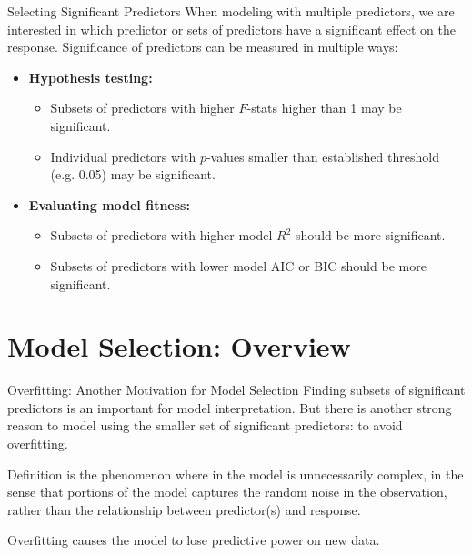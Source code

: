 \documentclass[12pt,t]{beamer}
\let\emph\relax %
\begin{document}
\begin{frame}{Selecting Significant Predictors} \small
\vskip-0.4cm
When modeling with multiple predictors, we are interested in which predictor or sets of predictors have a significant effect on the response. 
\vskip0.2cm
Significance of predictors can be measured in multiple ways:
\vskip0.1cm
\begin{itemize}
\item \textbf{Hypothesis testing:}
\vskip0.1cm
\begin{itemize}
\item Subsets of predictors with higher $F$-stats higher than 1 may be significant.
\vskip0.2cm
\item Individual predictors with $p$-values smaller than established threshold (e.g. 0.05) may be significant.
\vskip0.2cm
\end{itemize}
\item \textbf{Evaluating model fitness:} 
\vskip0.1cm
\begin{itemize}
\item Subsets of predictors with higher model $R^2$ should be more significant.
\vskip0.2cm
\item Subsets of predictors with lower model AIC or BIC should be more significant.
\end{itemize}
\end{itemize}
\end{frame}

\section{Model Selection: Overview}

\begin{frame}{Overfitting: Another Motivation for Model Selection} 
\vskip-0.4cm
Finding subsets of significant predictors is an important for model interpretation. But there is another strong reason to model using the smaller set of significant predictors: to avoid overfitting.
\vskip0.2cm
\begin{block}{Definition}
\emph{Overfitting} is the phenomenon where in the model is unnecessarily complex, in the sense that portions of the model captures the random noise in the observation, rather than the relationship between predictor(s) and response. 
\end{block}
\vskip0.2cm
Overfitting causes the model to lose predictive power on new data.
\end{frame}
\end{document}
